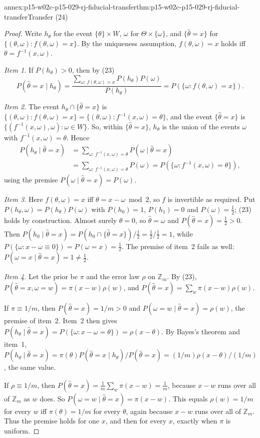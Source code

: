 \begin{annexitem}{annex:p15-w02c-p15-029-rj-fiducial-transfer}{thm:p15-w02c-p15-029-rj-fiducial-transfer}{Transfer (24)}
\begin{proof}
Write \(h_\theta\) for the event \(\{\theta\}\times W\), \(\omega\) for
\(\Theta\times\{\omega\}\), and \(\{\hat\theta=x\}\) for
\(\{(\theta,\omega):f(\theta,\omega)=x\}\). By the uniqueness assumption,
\(f(\theta,\omega)=x\) holds iff \(\theta=f^{-1}(x,\omega)\).

\emph{Item 1.} If \(P(h_\theta)>0\), then by (23)
\[
 P(\hat\theta=x\mid h_\theta)=\frac{\sum_{\omega:\,f(\theta,\omega)=x}P(h_\theta)P(\omega)}{P(h_\theta)}
 =P(\{\omega:f(\theta,\omega)=x\}).
\]

\emph{Item 2.} The event \(h_\theta\cap\{\hat\theta=x\}\) is
\(\{(\theta,\omega):f(\theta,\omega)=x\}=\{(\theta,\omega):f^{-1}(x,\omega)=\theta\}\),
and the event \(\{\hat\theta=x\}\) is
\(\{(f^{-1}(x,\omega),\omega):\omega\in W\}\). So, within
\(\{\hat\theta=x\}\), \(h_\theta\) is the union of the events \(\omega\)
with \(f^{-1}(x,\omega)=\theta\). Hence
\begin{align*}
 P(h_\theta\mid\hat\theta=x)&=\sum_{\omega:\,f^{-1}(x,\omega)=\theta}P(\omega\mid\hat\theta=x)\\
 &=\sum_{\omega:\,f^{-1}(x,\omega)=\theta}P(\omega)=P(\{\omega:f^{-1}(x,\omega)=\theta\}),
\end{align*}
using the premise \(P(\omega\mid\hat\theta=x)=P(\omega)\).

\emph{Item 3.} Here \(f(\theta,\omega)=x\) iff \(\theta=x-\omega\bmod2\),
so \(f\) is invertible as required. Put
\(P(h_\theta,\omega)=P(h_\theta)P(\omega)\) with \(P(h_0)=1\), \(P(h_1)=0\)
and \(P(\omega)=\tfrac12\); (23) holds by construction. Almost surely
\(\theta=0\), so \(\hat\theta=\omega\) and \(P(\hat\theta=x)=\tfrac12>0\).
Then \(P(h_0\mid\hat\theta=x)=P(h_0\cap\{\hat\theta=x\})/\tfrac12=\tfrac12/\tfrac12=1\),
while \(P(\{\omega:x-\omega\equiv0\})=P(\omega=x)=\tfrac12\). The premise of
item~2 fails as well: \(P(\omega=x\mid\hat\theta=x)=1\ne\tfrac12\).

\emph{Item 4.} Let the prior be \(\pi\) and the error law \(\rho\) on
\(\mathbb Z_m\). By (23),
\(P(\hat\theta=x,\omega=w)=\pi(x-w)\rho(w)\), and
\(P(\hat\theta=x)=\sum_w\pi(x-w)\rho(w)\).

If \(\pi\equiv1/m\), then \(P(\hat\theta=x)=1/m>0\) and
\(P(\omega=w\mid\hat\theta=x)=\rho(w)\), the premise of item~2. Item~2
then gives \(P(h_\theta\mid\hat\theta=x)=P(\{\omega:x-\omega=\theta\})=\rho(x-\theta)\).
By Bayes's theorem and item~1,
\(P(h_\theta\mid\hat\theta=x)=\pi(\theta)P(\hat\theta=x\mid h_\theta)/P(\hat\theta=x)=(1/m)\rho(x-\theta)/(1/m)\),
the same value.

If \(\rho\equiv1/m\), then \(P(\hat\theta=x)=\frac1m\sum_w\pi(x-w)=\frac1m\),
because \(x-w\) runs over all of \(\mathbb Z_m\) as \(w\) does. So
\(P(\omega=w\mid\hat\theta=x)=\pi(x-w)\). This equals \(\rho(w)=1/m\) for
every \(w\) iff \(\pi(\theta)=1/m\) for every \(\theta\), again because
\(x-w\) runs over all of \(\mathbb Z_m\). Thus the premise holds for one
\(x\), and then for every \(x\), exactly when \(\pi\) is uniform.
\end{proof}
\end{annexitem}
